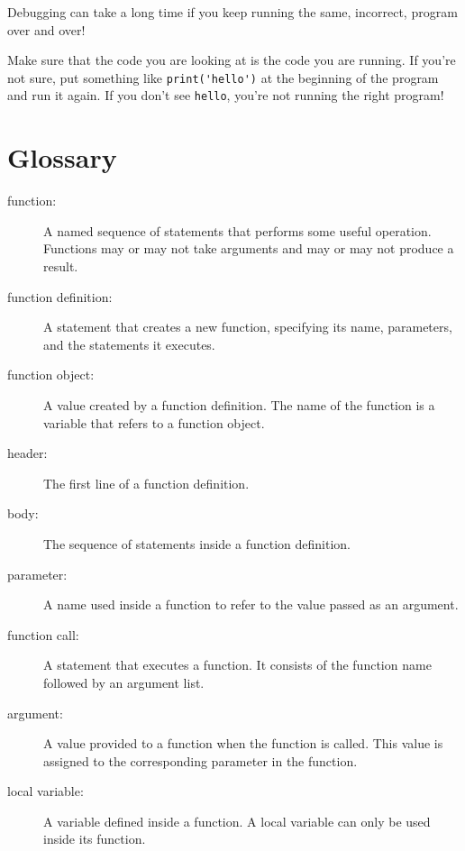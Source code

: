 \documentclass[10pt]{book}
\begin{document}
Debugging can take a long time if you keep running the same,
incorrect, program over and over!

Make sure that the code you are looking at is the code you are running.
If you're not sure, put something like \verb"print('hello')" at the
beginning of the program and run it again.  If you don't see
\verb"hello", you're not running the right program!




\section{Glossary}

\begin{description}

\item[function:] A named sequence of statements that performs some
useful operation.  Functions may or may not take arguments and may or
may not produce a result.

\item[function definition:]  A statement that creates a new function,
specifying its name, parameters, and the statements it executes.

\item[function object:]  A value created by a function definition.
The name of the function is a variable that refers to a function
object.

\item[header:] The first line of a function definition.

\item[body:] The sequence of statements inside a function definition.

\item[parameter:] A name used inside a function to refer to the value
passed as an argument.

\item[function call:] A statement that executes a function. It
consists of the function name followed by an argument list.

\item[argument:]  A value provided to a function when the function is called.
This value is assigned to the corresponding parameter in the function.

\item[local variable:]  A variable defined inside a function.  A local
variable can only be used inside its function.


\end{description}
\end{document}
